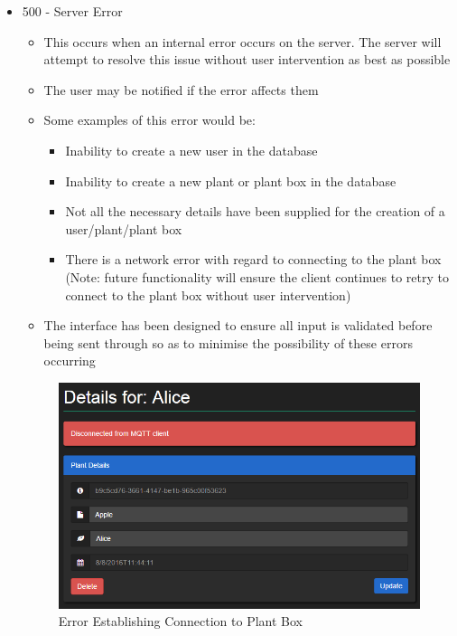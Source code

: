 \documentclass{article}
\begin{document}
\begin{itemize}
		\item 500 - Server Error
			\begin{itemize}
				\item This occurs when an internal error occurs on the server. The server will attempt to resolve this issue without user intervention as best as possible
				\item The user may be notified if the error affects them
				\item Some examples of this error would be:
				\begin{itemize}
					\item Inability to create a new user in the database
					\item Inability to create a new plant or plant box in the database
					\item Not all the necessary details have been supplied for the creation of a user/plant/plant box
					\item There is a network error with regard to connecting to the plant box (Note: future functionality will ensure the client continues to retry to connect to the plant box without user intervention)
				\end{itemize}
				\item The interface has been designed to ensure all input is validated before being sent through so as to minimise the possibility of these errors occurring
			\end{itemize}
			\begin{figure}[H]
				\includegraphics[width=\textwidth]{../images/UserManual/500error.png}
				\caption{Error Establishing Connection to Plant Box}
			\end{figure}
	\end{itemize}
\end{document}
